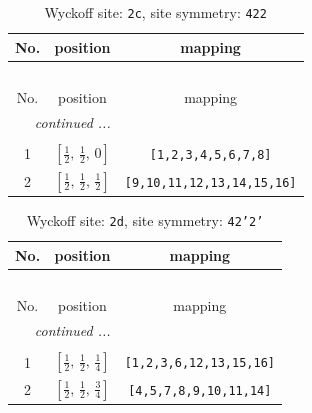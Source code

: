 \documentclass[fleqn,8pt]{jsarticle}
\begin{document}
\renewcommand{\arraystretch}{1.2}
\begin{longtable}{ccc}
\caption{Wyckoff site: {\tt 2c}, site symmetry: {\tt 422}}
 \\
 \hline \hline
No. & position & mapping \\ \hline \endfirsthead

\multicolumn{2}{l}{\tablename\ \thetable{}} \\
 \hline \hline
No. & position & mapping \\ \hline \endhead

 \hline \hline
\multicolumn{2}{r}{\footnotesize\it continued ...} \\ \endfoot

 \hline \hline
\multicolumn{2}{r}{} \\ \endlastfoot

1 & $\left[ \frac{1}{2},\, \frac{1}{2},\, 0 \right]$ & {\tt [1,2,3,4,5,6,7,8]} \\ \hline
2 & $\left[ \frac{1}{2},\, \frac{1}{2},\, \frac{1}{2} \right]$ & {\tt [9,10,11,12,13,14,15,16]} \\
\end{longtable}
\renewcommand{\arraystretch}{1.2}
\begin{longtable}{ccc}
\caption{Wyckoff site: {\tt 2d}, site symmetry: {\tt 42'2'}}
 \\
 \hline \hline
No. & position & mapping \\ \hline \endfirsthead

\multicolumn{2}{l}{\tablename\ \thetable{}} \\
 \hline \hline
No. & position & mapping \\ \hline \endhead

 \hline \hline
\multicolumn{2}{r}{\footnotesize\it continued ...} \\ \endfoot

 \hline \hline
\multicolumn{2}{r}{} \\ \endlastfoot

1 & $\left[ \frac{1}{2},\, \frac{1}{2},\, \frac{1}{4} \right]$ & {\tt [1,2,3,6,12,13,15,16]} \\ \hline
2 & $\left[ \frac{1}{2},\, \frac{1}{2},\, \frac{3}{4} \right]$ & {\tt [4,5,7,8,9,10,11,14]} \\
\end{longtable}
\renewcommand{\arraystretch}{1.2}
\end{document}
